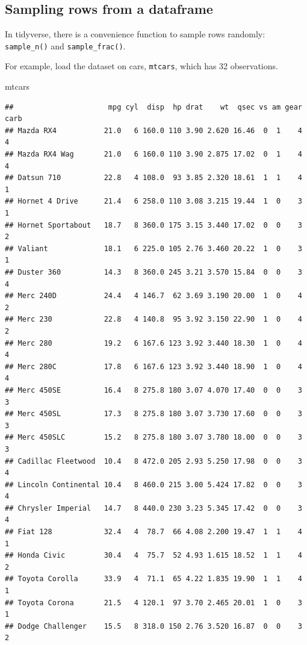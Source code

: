 \documentclass[]{book}
\newenvironment{Shaded}{\begin{snugshade}}{\end{snugshade}}
\newcommand{\NormalTok}[1]{#1}
\theoremstyle{definition}
\theoremstyle{definition}
\theoremstyle{definition}
\theoremstyle{remark}
\begin{document}
\subsection{Sampling rows from a
dataframe}\label{sampling-rows-from-a-dataframe}

In tidyverse, there is a convenience function to sample rows randomly:
\texttt{sample\_n()} and \texttt{sample\_frac()}.

For example, load the dataset on cars, \texttt{mtcars}, which has 32
observations.

\begin{Shaded}
\begin{Highlighting}[]
\NormalTok{mtcars}
\end{Highlighting}
\end{Shaded}

\begin{verbatim}
##                      mpg cyl  disp  hp drat    wt  qsec vs am gear carb
## Mazda RX4           21.0   6 160.0 110 3.90 2.620 16.46  0  1    4    4
## Mazda RX4 Wag       21.0   6 160.0 110 3.90 2.875 17.02  0  1    4    4
## Datsun 710          22.8   4 108.0  93 3.85 2.320 18.61  1  1    4    1
## Hornet 4 Drive      21.4   6 258.0 110 3.08 3.215 19.44  1  0    3    1
## Hornet Sportabout   18.7   8 360.0 175 3.15 3.440 17.02  0  0    3    2
## Valiant             18.1   6 225.0 105 2.76 3.460 20.22  1  0    3    1
## Duster 360          14.3   8 360.0 245 3.21 3.570 15.84  0  0    3    4
## Merc 240D           24.4   4 146.7  62 3.69 3.190 20.00  1  0    4    2
## Merc 230            22.8   4 140.8  95 3.92 3.150 22.90  1  0    4    2
## Merc 280            19.2   6 167.6 123 3.92 3.440 18.30  1  0    4    4
## Merc 280C           17.8   6 167.6 123 3.92 3.440 18.90  1  0    4    4
## Merc 450SE          16.4   8 275.8 180 3.07 4.070 17.40  0  0    3    3
## Merc 450SL          17.3   8 275.8 180 3.07 3.730 17.60  0  0    3    3
## Merc 450SLC         15.2   8 275.8 180 3.07 3.780 18.00  0  0    3    3
## Cadillac Fleetwood  10.4   8 472.0 205 2.93 5.250 17.98  0  0    3    4
## Lincoln Continental 10.4   8 460.0 215 3.00 5.424 17.82  0  0    3    4
## Chrysler Imperial   14.7   8 440.0 230 3.23 5.345 17.42  0  0    3    4
## Fiat 128            32.4   4  78.7  66 4.08 2.200 19.47  1  1    4    1
## Honda Civic         30.4   4  75.7  52 4.93 1.615 18.52  1  1    4    2
## Toyota Corolla      33.9   4  71.1  65 4.22 1.835 19.90  1  1    4    1
## Toyota Corona       21.5   4 120.1  97 3.70 2.465 20.01  1  0    3    1
## Dodge Challenger    15.5   8 318.0 150 2.76 3.520 16.87  0  0    3    2

\end{verbatim}
\end{document}
